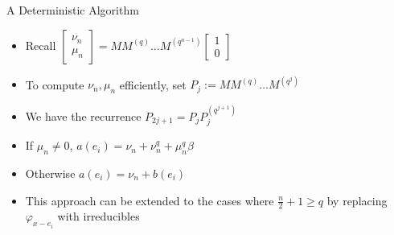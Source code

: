 \documentclass{beamer}
\begin{document}
\begin{frame}{A Deterministic Algorithm}
\begin{itemize}
\item Recall $\begin{bmatrix} \nu_{n} \\ \mu_n  \end{bmatrix} = M M^{(q)} \ldots M^{(q^{n-1})}  \begin{bmatrix} 1 \\ 0  \end{bmatrix}$
    \item To compute $\nu_n, \mu_n$ efficiently, set $ P_j := M M^{(q)} \ldots M^{(q^j)}$
    \item We have the recurrence $P_{2j + 1} = P_{j} P_{j}^{(q^{j+1})}$
    \item If $\mu_n \neq 0$, $a(e_i) = \nu_n + \nu_n^q + \mu_n^q \beta$
    \item Otherwise $a(e_i) = \nu_n + b(e_i)$
    \item This approach can be extended to the cases where $\frac{n}{2} + 1 \geq q$ by replacing $\varphi_{x-e_i}$ with irreducibles
\end{itemize}
    
\end{frame}











\end{document}
